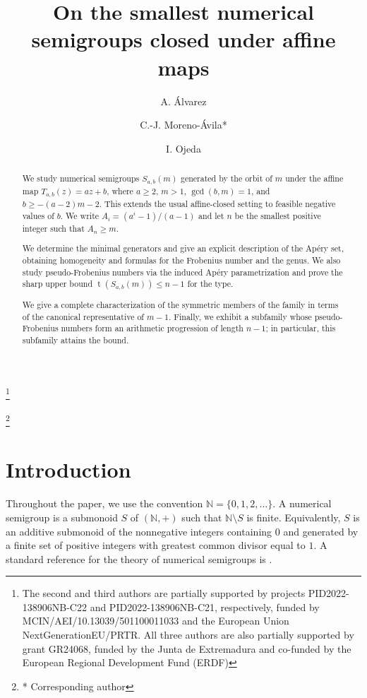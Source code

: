 \documentclass[12pt,a4paper]{amsart}
\title[Smallest numerical semigroups closed under affine maps]{On the smallest numerical semigroups closed under affine maps}
\author{A. \'Alvarez}
\author{C.-J. Moreno-\'Avila*}
\author{I. Ojeda}
\theoremstyle{definition}
\begin{document}
\begin{abstract}
We study numerical semigroups $S_{a,b}(m)$ generated by the orbit of $m$ under the affine map $T_{a,b}(z)=az+b$, where $a\ge 2$, $m>1$, $\gcd(b,m)=1$, and $b\ge -(a-2)m-2$. This extends the usual affine-closed setting to feasible negative values of $b$. We write $A_i=(a^i-1)/(a-1)$ and let $n$ be the smallest positive integer such that $A_n\ge m$.

We determine the minimal generators and give an explicit description of the Ap\'ery set, obtaining homogeneity and formulas for the Frobenius number and the genus. We also study pseudo-Frobenius numbers via the induced Ap\'ery parametrization and prove the sharp upper bound $\operatorname{t}(S_{a,b}(m))\le n-1$ for the type.

We give a complete characterization of the symmetric members of the family in terms of the canonical representative of $m-1$. Finally, we exhibit a subfamily whose pseudo-Frobenius numbers form an arithmetic progression of length $n-1$; in particular, this subfamily attains the bound.
\end{abstract}



\thanks{The second and third authors are partially supported by projects PID2022-138906NB-C22 and PID2022-138906NB-C21, respectively, funded by MCIN/AEI/10.13039/501100011033 and the European Union NextGenerationEU/PRTR. All three authors are also partially supported by grant GR24068, funded by the Junta de Extremadura and co-funded by the European Regional Development Fund (ERDF)}

\thanks{* Corresponding author}

\maketitle

\section{Introduction}

Throughout the paper, we use the convention $\mathbb{N}=\{0,1,2,\dots\}$. A numerical semigroup is a submonoid $S$ of $(\mathbb{N},+)$ such that $\mathbb{N}\setminus S$ is finite. Equivalently, $S$ is an additive submonoid of the nonnegative integers containing $0$ and generated by a finite set of positive integers with greatest common divisor equal to $1$. A standard reference for the theory of numerical semigroups is \cite{libro}.
\end{document}
